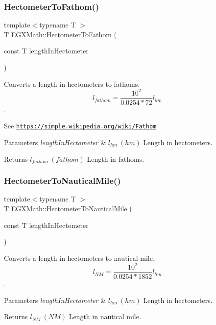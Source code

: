 \subsubsection{\texorpdfstring{Hectometer\+To\+Fathom()}{HectometerToFathom()}}
{\footnotesize\ttfamily template$<$typename T $>$ \\
T E\+G\+X\+Math\+::\+Hectometer\+To\+Fathom (\begin{DoxyParamCaption}\item[{const T}]{length\+In\+Hectometer }\end{DoxyParamCaption})}



Converts a length in hectometers to fathoms. \[ l_{fathom}= \frac{10^{2}}{0.0254 * 72} l_{hm} \]. 

See \href{https://simple.wikipedia.org/wiki/Fathom}{\tt https\+://simple.\+wikipedia.\+org/wiki/\+Fathom} 
\begin{DoxyParams}{Parameters}
{\em length\+In\+Hectometer} & $ l_{hm}\ (hm)$ Length in hectometers. \\
\hline
\end{DoxyParams}
\begin{DoxyReturn}{Returns}
$ l_{fathom}\ (fathom)$ Length in fathoms. 
\end{DoxyReturn}
\mbox{\label{group___e_g_x_math-_conversions-_length_conversions-_s_i-_hectometer-_nautical_ga74e84be72b4e2272d547b5d7e21211dc}} 
\subsubsection{\texorpdfstring{Hectometer\+To\+Nautical\+Mile()}{HectometerToNauticalMile()}}
{\footnotesize\ttfamily template$<$typename T $>$ \\
T E\+G\+X\+Math\+::\+Hectometer\+To\+Nautical\+Mile (\begin{DoxyParamCaption}\item[{const T}]{length\+In\+Hectometer }\end{DoxyParamCaption})}



Converts a length in hectometers to nautical mile. \[ l_{NM}= \frac{10^{2}}{0.0254 * 1852} l_{hm} \]. 


\begin{DoxyParams}{Parameters}
{\em length\+In\+Hectometer} & $ l_{hm}\ (hm)$ Length in hectometers. \\
\hline
\end{DoxyParams}
\begin{DoxyReturn}{Returns}
$ l_{NM}\ (NM)$ Length in nautical mile. 
\end{DoxyReturn}
